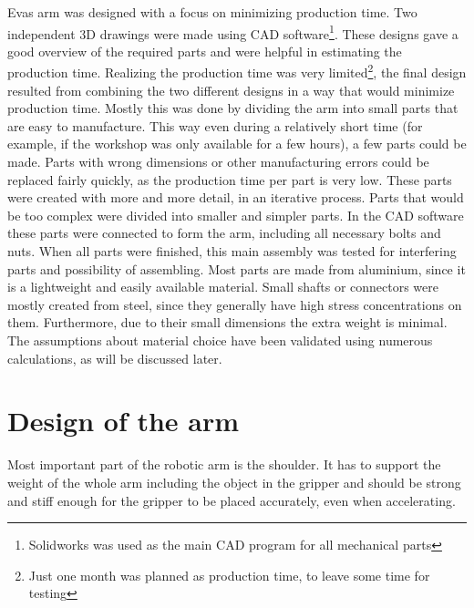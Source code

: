 \documentclass[technical_document.tex]{subfiles}
\begin{document}
Eva\textquotesingle{}s arm was designed with a focus on minimizing production time. %
Two independent 3D drawings were made using CAD software\footnote{Solidworks was used as the main CAD program for all mechanical parts}. These designs gave a good overview of the required parts and were helpful in estimating the production time. Realizing the production time was very limited\footnote{Just one month was planned as production time, to leave some time for testing}, the final design resulted from combining the two different designs in a way that would minimize production time.
Mostly this was done by dividing the arm into small parts that are easy to manufacture. This way even during a relatively short time (for example, if the workshop was only available for a few hours), a few parts could be made. Parts with wrong dimensions or other manufacturing errors could be replaced fairly quickly, as the production time per part is very low. 
These parts were created with more and more detail, in an iterative process. Parts that would be too complex were divided into smaller and simpler parts. In the CAD software these parts were connected to form the arm, including all necessary bolts and nuts. When all parts were finished, this main assembly was tested for interfering parts and possibility of assembling. Most parts are made from aluminium, since it is a lightweight and easily available material. Small shafts or connectors were mostly created from steel, since they generally have high stress concentrations on them. Furthermore, due to their small dimensions the extra weight is minimal. The assumptions about material choice have been validated using numerous calculations, as will be discussed later.

\section{Design of the arm}

Most important part of the robotic arm is the shoulder. It has to support the weight of the whole arm including the object in the gripper and should be strong and stiff enough for the gripper to be placed accurately, even when accelerating.
\end{document}
